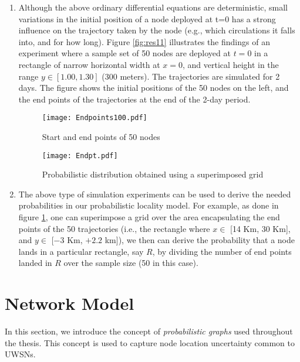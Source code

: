 \begin{enumerate}
\item Although the above ordinary differential equations are deterministic, small variations in the initial position of a node deployed at t=0 has a strong influence on the trajectory taken by the node (e.g., which circulations it falls into, and for how long).
Figure \ref{fig:res11} illustrates the findings of an experiment where a sample set of 50 nodes are deployed at $t= 0$ in a rectangle of narrow horizontal width at $x=0$, and vertical height in the range $y \in [1.00, 1.30]$ (300 meters). The trajectories are simulated for 2 days. The figure shows the initial positions of the 50 nodes on the left, and the end points of the trajectories at the end of the 2-day period. 
\begin{figure}[!htb]
\begin{minipage}[]{.55\linewidth}
\texttt{[image: Endpoints100.pdf]}
 \caption{ Start and end points of 50 nodes}
\label{fig:res11}
\end{minipage}
\begin{minipage}{.45\linewidth}
\texttt{[image: Endpt.pdf]}
 \caption{Probabilistic distribution obtained using a superimposed grid}
\label{fig:ges11}
 \end{minipage}
\end{figure}
\item The above type of simulation experiments can be used to derive the needed probabilities in our probabilistic locality model. For example, as done in figure \ref{fig:ges11}, one can superimpose a grid over the area encapsulating the end points of the 50 trajectories (i.e., the rectangle where $x \in$ [14 Km, 30 Km], and $y \in$ [$-3$ Km, $+2.2$ km]), we then can derive the probability that a node lands in a particular rectangle, say $R$, by dividing the number of end points landed in $R$ over the sample size (50 in this case).
\end{enumerate}



\section{Network Model}
\label{sec:Nmpf}
In this section, we introduce the concept of \textit{probabilistic graphs} used throughout the thesis. This concept is used to capture node location uncertainty common to UWSNs.

